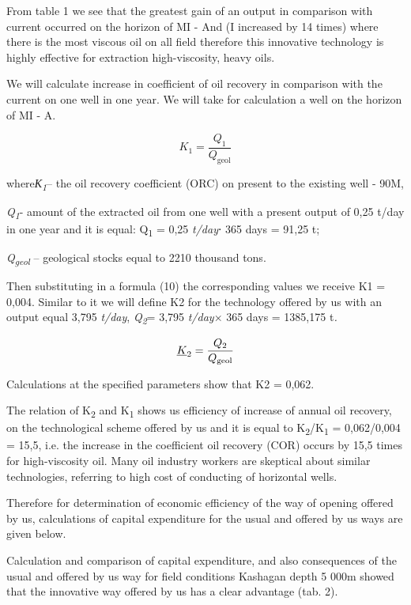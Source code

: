 \begin{multicols}{2}
From table 1 we see that the greatest gain of an output in comparison
with current occurred on the horizon of MI - And (I increased by 14
times) where there is the most viscous oil on all field therefore this
innovative technology is highly effective for extraction high-viscosity,
heavy oils.

We will calculate increase in coefficient of oil recovery in comparison
with the current on one well in one year. We will take for calculation a
well on the horizon of MI - A.

\begin{equation}
K_{\text{1}} = \frac{Q_{\text{1}}}{Q_{\text{geol}}}
\end{equation}

where\emph{К\textsubscript{1}}-- the oil recovery coefficient (ORC) on
present to the existing well - 90M,

\emph{Q\textsubscript{1}}- amount of the extracted oil from one well
with a present output of 0,25 t/day in one year and it is equal:
Q\textsubscript{1} = 0,25 \emph{t/day}⋅ 365 days = 91,25 t;

\emph{Q\textsubscript{geol}} -- geological stocks equal to 2210 thousand
tons.

Then substituting in a formula (10) the corresponding values we receive
K1 = 0,004. Similar to it we will define K2 for the technology offered
by us with an output equal 3,795 \emph{t/day},
\emph{Q\textsubscript{2}}= 3,795 \emph{t/day}× 365 days = 1385,175
t\emph{.}

\begin{equation}
\emph{K}_{2} = \frac{Q_{2}}{Q_{\text{geol}}}
\end{equation}

Calculations at the specified parameters show that K2 = 0,062.

The relation of K\textsubscript{2} and K\textsubscript{1} shows us
efficiency of increase of annual oil recovery, on the technological
scheme offered by us and it is equal to
K\textsubscript{2}/K\textsubscript{1} = 0,062/0,004 = 15,5, i.e. the
increase in the coefficient oil recovery (COR) occurs by 15,5 times for
high-viscosity oil. Many oil industry workers are skeptical about
similar technologies, referring to high cost of conducting of horizontal
wells.

Therefore for determination of economic efficiency of the way of opening
offered by us, calculations of capital expenditure for the usual and
offered by us ways are given below.

Calculation and comparison of capital expenditure, and also consequences
of the usual and offered by us way for field conditions Kashagan depth 5
000m showed that the innovative way offered by us has a clear advantage
(tab. 2).
\end{multicols}

